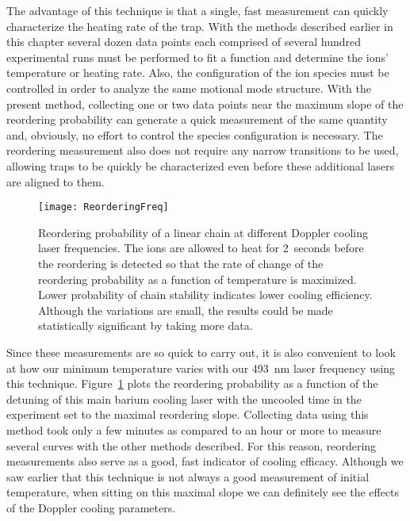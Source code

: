 The advantage of this technique is that a single, fast measurement can quickly characterize the heating rate of the trap.  With the methods described earlier in this chapter several dozen data points each comprised of several hundred experimental runs must be performed to fit a function and determine the ions' temperature or heating rate.  Also, the configuration of the ion species must be controlled in order to analyze the same motional mode structure.  With the present method, collecting one or two data points near the maximum slope of the reordering probability can generate a quick measurement of the same quantity and, obviously, no effort to control the species configuration is necessary.  The reordering measurement also does not require any narrow transitions to be used, allowing traps to be quickly be characterized even before these additional lasers are aligned to them.

\begin{figure}
	\centering
	\texttt{[image: ReorderingFreq]}
	\caption[Reordering probability at different cooling laser detunings]{Reordering probability of a linear chain at different Doppler cooling laser frequencies.  The ions are allowed to heat for 2~seconds before the reordering is detected so that the rate of change of the reordering probability as a function of temperature is maximized. Lower probability of chain stability indicates lower cooling efficiency.  Although the variations are small, the results could be made statistically significant by taking more data.}
	\label{fig:reordering-freq}
\end{figure}

Since these measurements are so quick to carry out, it is also convenient to look at how our minimum temperature varies with our 493~nm laser frequency using this technique.  Figure~\ref{fig:reordering-freq} plots the reordering probability as a function of the detuning of this main barium cooling laser with the uncooled time in the experiment set to the maximal reordering slope.  Collecting data using this method took only a few minutes as compared to an hour or more to measure several curves with the other methods described.  For this reason, reordering measurements also serve as a good, fast indicator of cooling efficacy.  Although we saw earlier that this technique is not always a good measurement of initial temperature, when sitting on this maximal slope we can definitely see the effects of the Doppler cooling parameters.

